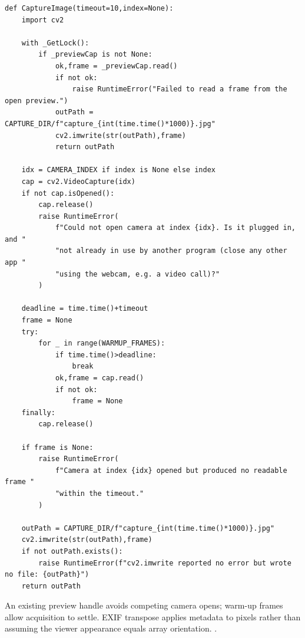 \begin{lstlisting}[style=plain]
def CaptureImage(timeout=10,index=None):
    import cv2

    with _GetLock():
        if _previewCap is not None:
            ok,frame = _previewCap.read()
            if not ok:
                raise RuntimeError("Failed to read a frame from the open preview.")
            outPath = CAPTURE_DIR/f"capture_{int(time.time()*1000)}.jpg"
            cv2.imwrite(str(outPath),frame)
            return outPath

    idx = CAMERA_INDEX if index is None else index
    cap = cv2.VideoCapture(idx)
    if not cap.isOpened():
        cap.release()
        raise RuntimeError(
            f"Could not open camera at index {idx}. Is it plugged in, and "
            "not already in use by another program (close any other app "
            "using the webcam, e.g. a video call)?"
        )

    deadline = time.time()+timeout
    frame = None
    try:
        for _ in range(WARMUP_FRAMES):
            if time.time()>deadline:
                break
            ok,frame = cap.read()
            if not ok:
                frame = None
    finally:
        cap.release()

    if frame is None:
        raise RuntimeError(
            f"Camera at index {idx} opened but produced no readable frame "
            "within the timeout."
        )

    outPath = CAPTURE_DIR/f"capture_{int(time.time()*1000)}.jpg"
    cv2.imwrite(str(outPath),frame)
    if not outPath.exists():
        raise RuntimeError(f"cv2.imwrite reported no error but wrote no file: {outPath}")
    return outPath
\end{lstlisting}
An existing preview handle avoids competing camera opens; warm-up frames allow acquisition to settle. EXIF transpose applies metadata to pixels rather than assuming the viewer appearance equals array orientation. \cite{opencvcamera,pillowops}.

